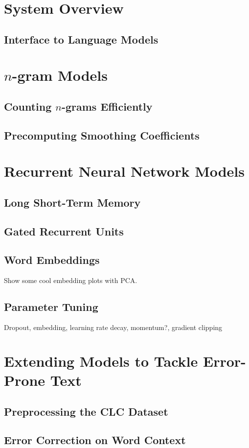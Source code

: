 \documentclass[a4paper, 12pt]{report}
\begin{document}
\section{System Overview}
\subsection{Interface to Language Models}
\section{$n$-gram Models}
\subsection{Counting $n$-grams Efficiently}
\subsection{Precomputing Smoothing Coefficients}
\section{Recurrent Neural Network Models}
\subsection{Long Short-Term Memory}
\subsection{Gated Recurrent Units}
\subsection{Word Embeddings}
Show some cool embedding plots with PCA.
\subsection{Parameter Tuning}
Dropout, embedding, learning rate decay, momentum?, gradient clipping
\section{Extending Models to Tackle Error-Prone Text}
\subsection{Preprocessing the CLC Dataset}
\subsection{Error Correction on Word Context}
\end{document}
